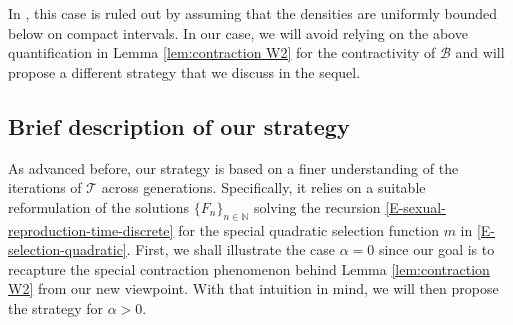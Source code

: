 \documentclass[reqno]{amsart}
\numberwithin{equation}{section}
\begin{document}
{In \cite{R-21-arxiv}, this case is ruled out by assuming that the densities are uniformly bounded below on compact intervals. In our case, we will avoid relying on the above quantification in Lemma \ref{lem:contraction W2} for the contractivity of $\mathcal{B}$ and will propose a different strategy that we discuss in the sequel.

\subsection{Brief description of our strategy}\label{SS-strategy} As advanced before, our strategy is based on a finer understanding of the iterations of $\mathcal T$ across generations. Specifically, it relies on a suitable reformulation of the solutions $\{F_n\}_{n\in \mathbb{N}}$ solving the recursion \eqref{E-sexual-reproduction-time-discrete} for the special quadratic selection function $m$ in \eqref{E-selection-quadratic}. First, we shall illustrate the case $\alpha=0$ since our goal is to recapture the special contraction phenomenon behind Lemma \ref{lem:contraction W2} from our new viewpoint. With that intuition in mind, we will then propose the strategy for $\alpha>0.$

\medskip

}
\end{document}
